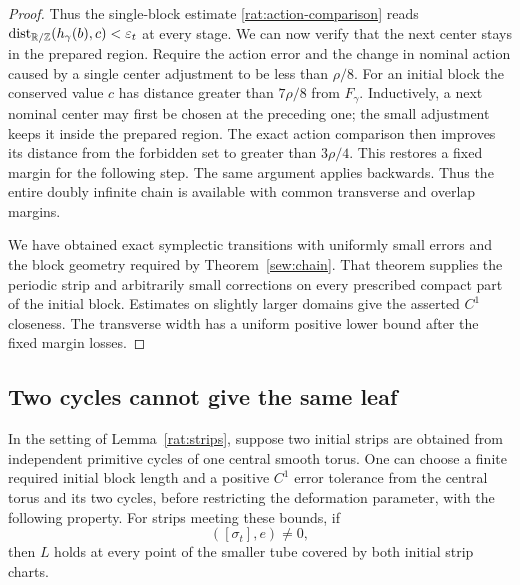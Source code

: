 \begin{proof}
Thus the single-block estimate \eqref{rat:action-comparison} reads
$\operatorname{dist}_{\mathbb R/\mathbb Z}(h_\gamma(b),c)<\varepsilon_t$
at every stage. We can now verify that the next center stays in
the prepared region. Require the action error and the change in
nominal action caused by a single center adjustment to be less
than $\rho/8$. For an initial block the conserved value $c$ has
distance greater than $7\rho/8$ from $F_\gamma$. Inductively,
a next nominal center may first be chosen at the preceding one;
the small adjustment keeps it inside the prepared region. The
exact action comparison then improves its distance from the
forbidden set to greater than $3\rho/4$. This restores a fixed
margin for the following step. The same argument applies
backwards. Thus the entire doubly infinite chain is available
with common transverse and overlap margins.

We have obtained exact symplectic transitions with uniformly
small errors and the block geometry required by
Theorem~\ref{sew:chain}. That theorem supplies the periodic strip
and arbitrarily small corrections on every prescribed compact
part of the initial block. Estimates on slightly larger domains
give the asserted $C^1$ closeness. The transverse width has a
uniform positive lower bound after the fixed margin losses.
\end{proof}

\subsection{Two cycles cannot give the same leaf}

\begin{lemma}\label{rat:two-periods}
In the setting of Lemma~\ref{rat:strips}, suppose two initial
strips are obtained from independent primitive cycles of one
central smooth torus. One can choose a finite required initial block
length and a positive $C^1$ error tolerance from the central torus
and its two cycles, before restricting the deformation parameter,
with the following property. For strips meeting these bounds, if
\begin{equation}\label{rat:destroy-fiber}
 ([\sigma_t],e)\ne0,
\end{equation}
then $L$ holds at every point of the smaller tube covered by both
initial strip charts.
\end{lemma}

